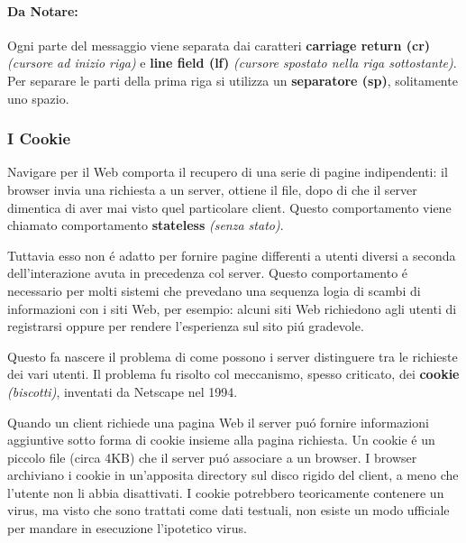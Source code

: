 \documentclass[12pt]{article}
\begin{document}
\paragraph{Da Notare:} Ogni parte del messaggio viene separata dai caratteri \textbf{carriage return (cr)} \textit{(cursore ad 
inizio riga)} e \textbf{line field (lf)} \textit{(cursore spostato nella riga sottostante)}.
Per separare le parti della prima riga si utilizza un \textbf{separatore (sp)}, solitamente uno spazio.

\clearpage%
\subsubsection{I Cookie}\label{web-http-http-i-cookie}
Navigare per il Web comporta il recupero di una serie di pagine indipendenti: il browser invia una richiesta a un server, ottiene il 
file, dopo di che il server dimentica di aver mai visto quel particolare client. Questo comportamento viene chiamato comportamento 
\textbf{stateless} \textit{(senza stato)}.

Tuttavia esso non \'e adatto per fornire pagine differenti a utenti diversi a seconda dell'interazione avuta in precedenza col 
server. Questo comportamento \'e necessario per molti sistemi che prevedano una sequenza logia di scambi di informazioni con i 
siti Web, per esempio: alcuni siti Web richiedono agli utenti di registrarsi oppure per rendere l'esperienza sul sito pi\'u 
gradevole.

Questo fa nascere il problema di come possono i server distinguere tra le richieste dei vari utenti. Il problema fu risolto col 
meccanismo, spesso criticato, dei \textbf{cookie} \textit{(biscotti)}, inventati da Netscape nel 1994.

Quando un client richiede una pagina Web il server pu\'o fornire informazioni aggiuntive sotto forma di cookie insieme alla pagina 
richiesta. Un cookie \'e un piccolo file (circa 4KB) che il server pu\'o associare a un browser. I browser archiviano i cookie in 
un'apposita directory sul disco rigido del client, a meno che l'utente non li abbia disattivati. I cookie potrebbero teoricamente 
contenere un virus, ma visto che sono trattati come dati testuali, non esiste un modo ufficiale per mandare in esecuzione 
l'ipotetico virus.
\end{document}
